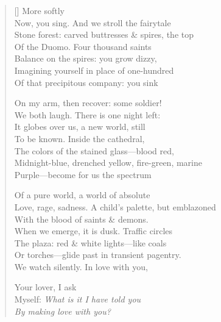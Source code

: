 \label{ch:milano_lover}
\settowidth{\versewidth}{Love, rage, sadness. A child's palette, but emblazoned}
\begin{verse}[\versewidth]
\hspace*{2\vgap} More softly\\
Now, you sing.   And we stroll the fairytale\\
Stone forest: carved buttresses \& spires, the top\\
Of the Duomo.    Four thousand saints\\
Balance on the spires: you grow dizzy,\\
Imagining yourself in place of one-hundred\\
Of that precipitous company: you sink

On my arm, then recover: some soldier!\\
We both laugh.   There is one night left:\\
It globes over us, a new world, still\\
To be known.   Inside the cathedral,\\
The colors of the stained glass---blood red,\\
Midnight-blue, drenched yellow, fire-green, marine\\
Purple---become for us the spectrum

Of a pure world, a world of absolute\\
Love, rage, sadness. A child's palette, but emblazoned\\
With the blood of saints \& demons.\\
When we emerge, it is dusk.   Traffic circles\\
The plaza: red \& white lights---like coals\\
Or torches---glide past in transient pagentry.\\
We watch silently.    In love with you,

Your lover, I ask\\
Myself: \textit{What is it I have told you\\
By making love with you?}
\end{verse}
